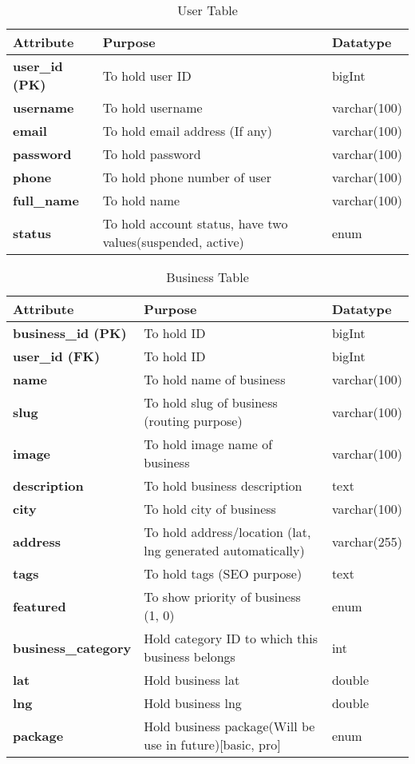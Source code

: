 \documentclass[a4paper]{report}
\begin{document}
\begin{table}[ht]
\centering
\caption{User Table}
\begin{tabular}{lll}    \toprule
Attribute & Purpose & Datatype  \\\midrule
\textbf{user\_id (PK)}    & To hold user ID & bigInt  \\ 
\textbf{username}    & To hold username & varchar(100)  \\ 
\textbf{email}    & To hold email address (If any) & varchar(100)  \\ 
\textbf{password}    & To hold password  & varchar(100) \\
\textbf{phone}    & To hold phone number of user  & varchar(100) \\ 
\textbf{full\_name}    & To hold name  & varchar(100) \\
\textbf{status}    & To hold account status, have two values(suspended, active)  & enum\\
\bottomrule
\end{tabular}
\label{tab:User Table}
\end{table}

\vspace*{0.1 cm}
\begin{table}[ht]
\centering
\caption{Business Table}
\begin{tabular}{lll}    \toprule
Attribute & Purpose & Datatype  \\\midrule
\textbf{business\_id (PK)}    & To hold ID & bigInt  \\
\textbf{user\_id (FK)}    & To hold ID & bigInt  \\  
\textbf{name}    & To hold name of business & varchar(100)  \\
\textbf{slug}    & To hold slug of business (routing purpose) & varchar(100)  \\ 
\textbf{image}    & To hold image name of business & varchar(100)  \\ 
\textbf{description}    & To hold business description & text\\ 
\textbf{city}    & To hold city of business & varchar(100)\\ 
\textbf{address}    & To hold address/location (lat, lng generated automatically)  & varchar(255) \\ 
\textbf{tags}    & To hold tags (SEO purpose)  & text \\
\textbf{featured}    & To show priority of business (1, 0)  & enum\\
\textbf{business\_category}    & Hold category ID to which this business belongs & int  \\
\textbf{lat}    & Hold business lat & double  \\
\textbf{lng}    & Hold business lng & double  \\
\textbf{package}    & Hold business package(Will be use in future)[basic, pro] & enum  \\
\bottomrule
\end{tabular}
\label{Business Table}
\end{table}
\end{document}
